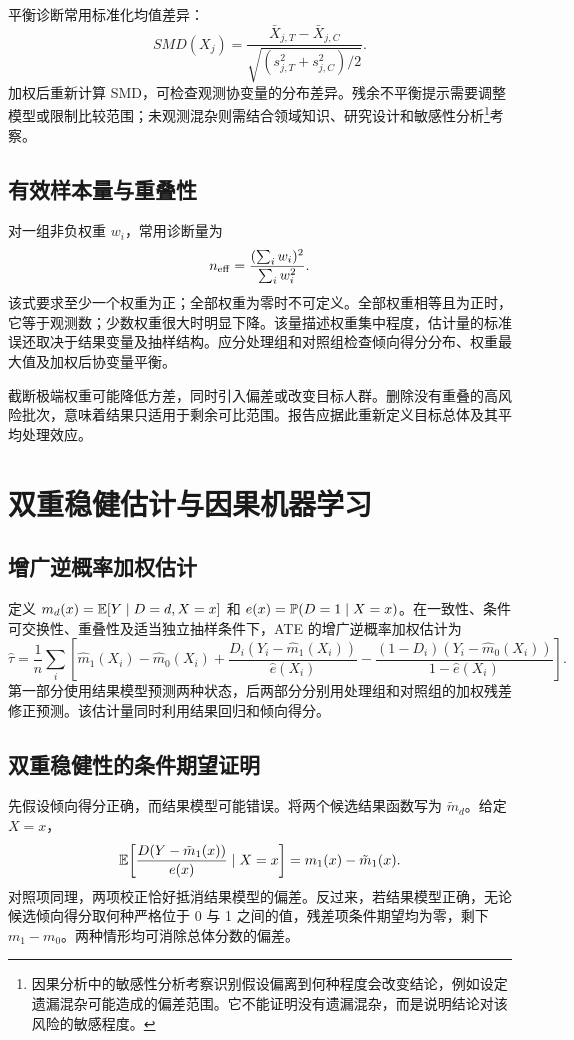 平衡诊断常用标准化均值差异：
\[
  SMD(X_j)
  =
  \frac{\bar X_{j,T}-\bar X_{j,C}}
       {\sqrt{(s_{j,T}^{2}+s_{j,C}^{2})/2}}.
\]
加权后重新计算 SMD，可检查观测协变量的分布差异。残余不平衡提示需要调整模型或限制比较范围；未观测混杂则需结合领域知识、研究设计和敏感性分析\footnote{因果分析中的敏感性分析考察识别假设偏离到何种程度会改变结论，例如设定遗漏混杂可能造成的偏差范围。它不能证明没有遗漏混杂，而是说明结论对该风险的敏感程度。}考察。

\subsection{有效样本量与重叠性}
对一组非负权重 \(w_i\)，常用诊断量为
\[
n_{\rm eff}=\frac{(\sum_iw_i)^2}{\sum_iw_i^2}.
\]
该式要求至少一个权重为正；全部权重为零时不可定义。全部权重相等且为正时，
它等于观测数；少数权重很大时明显下降。该量描述权重集中程度，估计量的标准误还取决于结果变量及抽样结构。应分处理组和对照组检查倾向得分分布、权重最大值及加权后协变量平衡。

截断极端权重可能降低方差，同时引入偏差或改变目标人群。删除没有重叠的高风险批次，意味着结果只适用于剩余可比范围。报告应据此重新定义目标总体及其平均处理效应。

\section{双重稳健估计与因果机器学习}

\subsection{增广逆概率加权估计}
定义 \(m_d(x)=\mathbb E[Y\mid D=d,X=x]\) 和 \(e(x)=\mathbb P(D=1\mid X=x)\)。在一致性、条件可交换性、重叠性及适当独立抽样条件下，ATE 的增广逆概率加权估计为
\[
\hat\tau=\frac1n\sum_i\left[
\hat m_1(X_i)-\hat m_0(X_i)
+\frac{D_i(Y_i-\hat m_1(X_i))}{\hat e(X_i)}
-\frac{(1-D_i)(Y_i-\hat m_0(X_i))}{1-\hat e(X_i)}
\right].
\]
第一部分使用结果模型预测两种状态，后两部分分别用处理组和对照组的加权残差修正预测。该估计量同时利用结果回归和倾向得分。

\subsection{双重稳健性的条件期望证明}
先假设倾向得分正确，而结果模型可能错误。将两个候选结果函数写为 \(\tilde m_d\)。给定 \(X=x\)，
\[
\mathbb E\!\left[\frac{D(Y-\tilde m_1(x))}{e(x)}\mid X=x\right]
=m_1(x)-\tilde m_1(x).
\]
对照项同理，两项校正恰好抵消结果模型的偏差。反过来，若结果模型正确，无论候选倾向得分取何种严格位于 0 与 1 之间的值，残差项条件期望均为零，剩下 \(m_1-m_0\)。两种情形均可消除总体分数的偏差。


